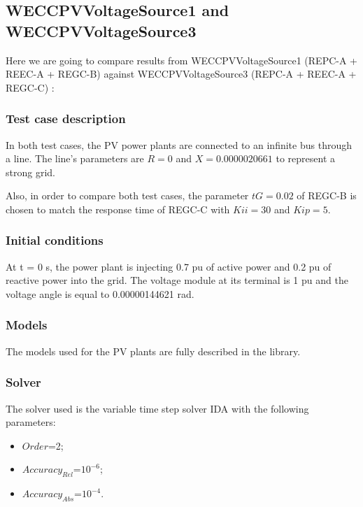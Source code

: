 \documentclass[a4paper, 12pt]{report}
\begin{document}
\subsection{WECCPVVoltageSource1 and WECCPVVoltageSource3}
Here we are going to compare results from WECCPVVoltageSource1 (REPC-A + REEC-A + REGC-B) against WECCPVVoltageSource3 (REPC-A + REEC-A + REGC-C) :

\subsubsection{Test case description}
In both test cases, the PV power plants are connected to an infinite bus through a line.
The line's parameters are $R = 0$ and $X = 0.0000020661$ to represent a strong grid.

Also, in order to compare both test cases, the parameter $tG = 0.02$ of REGC-B is chosen to match the response time of REGC-C with $Kii = 30$ and $Kip = 5$.


\subsubsection{Initial conditions}

\par At t = 0 s, the power plant is injecting 0.7 pu of active power and 0.2 pu of reactive power into the grid. The voltage module at its terminal is 1 pu and the voltage angle is equal to 0.00000144621 rad.

\subsubsection{Models}

\par The models used for the PV plants are fully described in the \Dynawo library.

\subsubsection{Solver}

\par The solver used is the variable time step solver IDA with the following parameters:
\begin{itemize}
\item $Order$=2;
\item $Accuracy_{Rel}$=$10^{-6}$;
\item $Accuracy_{Abs}$=$10^{-4}$.
\end{itemize}
\end{document}
